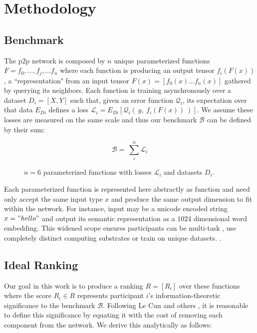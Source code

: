 \documentclass{article}
\begin{document}
\section{Methodology}
\label{methodology}

\subsection{Benchmark}

The p2p network is composed by $n$ unique parameterized functions $F = {f_0, ...,  f_j, ...f_n}$ where each function is producing an output tensor $f_i(F(x))$, a ``representation" from an input tensor $F(x) = [f_0{(x)} ... f_n{(x)}]$ gathered by querying its neighbors. Each function is training asynchronously over a dataset $D_i=[X,Y]$ such that, given an error function $\mathcal{Q}_i$, its expectation over that data $E_{Di}$ defines a loss $\mathcal{L}_i = E_{Di}[\mathcal{Q}_i( \ y, \ f_i(F(x)) \ )]$. We assume these losses are measured on the same scale and thus our benchmark $\mathcal{B}$ can be defined by their sum:

\begin{equation}
\mathcal{B} = \ \sum_{i}^{n} \mathcal{L}_i 
\end{equation}

\begin{figure}[H]
	\centering
	\hspace*{-2cm}
	
	\caption{$n=6$ parameterized functions with losses $\mathcal{L}_i$ and datasets $D_i$.}
\end{figure}{}

Each parameterized function is represented here abstractly as function \cite{hinton2015distilling} and need only accept the same input type $x$ and produce the same output dimension to fit within the network. For instance, input may be a unicode encoded string $x = "hello"$ and output its semantic representation as a $1024$ dimensional word embedding. This widened scope ensures participants can be multi-task \cite{kaiser2017model}, use completely distinct computing substrates \cite{alex2014cortical} or train on unique datasets. \cite{lample2019crosslingual}. 

\subsection{Ideal Ranking}

Our goal in this work is to produce a ranking $R = [R_i]$ over these functions where the score $R_i \in R$ represents participant $i$'s information-theoretic significance to the benchmark $\mathcal{B}$. Following Le Cun and others \cite{lecun1989optimalbraindamage,yu2017nisp}, it is reasonable to define this significance by equating it with the cost of removing each component from the network. We derive this analytically as follows:
\end{document}
